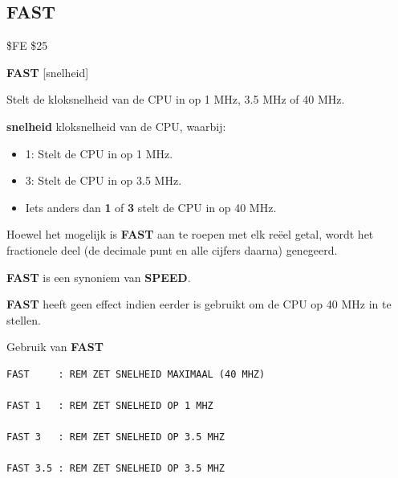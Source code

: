 \subsection{FAST}
\begin{description}[leftmargin=2cm,style=nextline]
\item [Token:]    \$FE \$25

\item [Formaat:]   {\bf FAST} [snelheid]

\item [Gebruik:]    Stelt de kloksnelheid van de CPU in op 1 MHz, 3.5 MHz of 40 MHz.

                  {\bf snelheid} kloksnelheid van de CPU, waarbij:

                  \begin{itemize}
                     \item 1: Stelt de CPU in op 1 MHz.                     \item 3: Stelt de CPU in op 3.5 MHz.                     \item Iets anders dan {\bf 1} of {\bf 3} stelt de CPU in op 40 MHz.
                  \end{itemize}

\item [Opmerkingen:]  Hoewel het mogelijk is {\bf FAST} aan te roepen met elk reëel getal, wordt het fractionele deel (de decimale punt en alle cijfers daarna) genegeerd.

                  {\bf FAST} is een synoniem van {\bf SPEED}.

                  {\bf FAST} heeft geen effect indien eerder  is gebruikt om de CPU op 40 MHz in te stellen.

\item [Voorbeelden:] Gebruik van {\bf FAST}

\begin{tcolorbox}[colback=black,coltext=white]
\verbatimfont{\codefont}
\begin{verbatim}
FAST     : REM ZET SNELHEID MAXIMAAL (40 MHZ)

FAST 1   : REM ZET SNELHEID OP 1 MHZ

FAST 3   : REM ZET SNELHEID OP 3.5 MHZ

FAST 3.5 : REM ZET SNELHEID OP 3.5 MHZ
\end{verbatim}
\end{tcolorbox}
\end{description}

